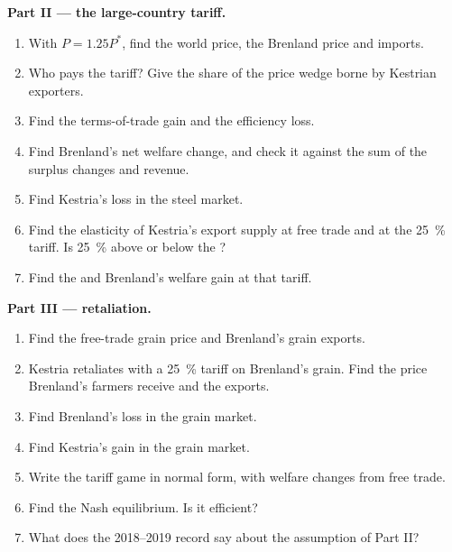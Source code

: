\begin{problem}
\medskip\noindent\textbf{Part II --- the large-country tariff.}
\begin{enumerate}[resume]
\item With $P = 1.25P^*$, find the world price, the Brenland price and imports.
\item Who pays the tariff? Give the share of the price wedge borne by Kestrian
exporters.
\item Find the terms-of-trade gain and the efficiency loss.
\item Find Brenland's net welfare change, and check it against the sum of the
surplus changes and revenue.
\item Find Kestria's loss in the steel market.
\item Find the elasticity of Kestria's export supply at free trade and at the 25~\%
tariff. Is 25~\% above or below the ?
\item Find the  and Brenland's welfare gain at that tariff.
\end{enumerate}

\medskip\noindent\textbf{Part III --- retaliation.}
\begin{enumerate}[resume]
\item Find the free-trade grain price and Brenland's grain exports.
\item Kestria retaliates with a 25~\% tariff on Brenland's grain. Find the price
Brenland's farmers receive and the exports.
\item Find Brenland's loss in the grain market.
\item Find Kestria's gain in the grain market.
\item Write the tariff game in normal form, with welfare changes from free trade.
\item Find the Nash equilibrium. Is it efficient?
\item What does the 2018--2019 record say about the assumption of Part II?
\end{enumerate}


\end{problem}

